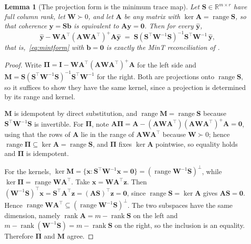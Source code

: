 \documentclass[11pt]{article}
\theoremstyle{plain}
\newtheorem{lemma}[theorem]{Lemma}
\theoremstyle{definition}
\theoremstyle{remark}
\newcommand{\bA}{\bm{A}}
\newcommand{\by}{\bm{y}}
\newcommand{\bb}{\bm{b}}
\newcommand{\yhat}{\hat{\by}}
\newcommand{\Rb}{\mathbb{R}}
\begin{document}
\begin{lemma}[The projection form is the minimum trace map]
\label{lem:mintequiv}
Let $\bm{S} \in \Rb^{m \times r}$ have full column rank, let $\bm{W} \succ 0$, and let $\bA$ be any matrix with $\ker \bA = \operatorname{range}\bm{S}$, so that coherence $\by = \bm{S}\bm{b}$ is equivalent to $\bA\by = \bm{0}$. Then for every $\yhat$,
\begin{equation}
\yhat - \bm{W}\bA^{\top}\left(\bA\bm{W}\bA^{\top}\right)^{+}\bA\yhat
\;=\;
\bm{S}\left(\bm{S}^{\top}\bm{W}^{-1}\bm{S}\right)^{-1}\bm{S}^{\top}\bm{W}^{-1}\,\yhat ,
\label{eq:mintequiv}
\end{equation}
that is,~\eqref{eq:mintform} with $\bb=\bm{0}$ is exactly the MinT reconciliation of \citet{wickramasuriya2019mint}.
\end{lemma}
\begin{proof}
Write $\bm{\Pi} = \bm{I} - \bm{W}\bA^{\top}(\bA\bm{W}\bA^{\top})^{+}\bA$ for the left side and $\bm{M} = \bm{S}(\bm{S}^{\top}\bm{W}^{-1}\bm{S})^{-1}\bm{S}^{\top}\bm{W}^{-1}$ for the right. Both are projections onto $\operatorname{range}\bm{S}$, so it suffices to show they have the same kernel, since a projection is determined by its range and kernel.

$\bm{M}$ is idempotent by direct substitution, and $\operatorname{range}\bm{M} = \operatorname{range}\bm{S}$ because $\bm{S}^{\top}\bm{W}^{-1}\bm{S}$ is invertible. For $\bm{\Pi}$, note $\bA\bm{\Pi} = \bA - (\bA\bm{W}\bA^{\top})(\bA\bm{W}\bA^{\top})^{+}\bA = \bm{0}$, using that the rows of $\bA$ lie in the range of $\bA\bm{W}\bA^{\top}$ because $\bm{W}\succ0$; hence $\operatorname{range}\bm{\Pi} \subseteq \ker\bA = \operatorname{range}\bm{S}$, and $\bm{\Pi}$ fixes $\ker\bA$ pointwise, so equality holds and $\bm{\Pi}$ is idempotent.

For the kernels, $\ker\bm{M} = \{\bm{x} : \bm{S}^{\top}\bm{W}^{-1}\bm{x} = \bm{0}\} = (\operatorname{range}\bm{W}^{-1}\bm{S})^{\perp}$, while $\ker\bm{\Pi} = \operatorname{range}\bm{W}\bA^{\top}$. Take $\bm{x} = \bm{W}\bA^{\top}\bm{z}$. Then $(\bm{W}^{-1}\bm{S})^{\top}\bm{x} = \bm{S}^{\top}\bA^{\top}\bm{z} = (\bA\bm{S})^{\top}\bm{z} = \bm{0}$, since $\operatorname{range}\bm{S} = \ker\bA$ gives $\bA\bm{S}=\bm{0}$. Hence $\operatorname{range}\bm{W}\bA^{\top} \subseteq (\operatorname{range}\bm{W}^{-1}\bm{S})^{\perp}$. The two subspaces have the same dimension, namely $\operatorname{rank}\bA = m - \operatorname{rank}\bm{S}$ on the left and $m - \operatorname{rank}(\bm{W}^{-1}\bm{S}) = m - \operatorname{rank}\bm{S}$ on the right, so the inclusion is an equality. Therefore $\bm{\Pi}$ and $\bm{M}$ agree.
\end{proof}
\end{document}

